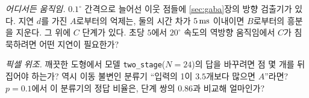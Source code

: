 \begin{exercise}[\lvlB]
\label{ex:12:7}
\emph{어디서든 움직임.} $0.1^\circ$ 간격으로 늘어선 이웃 점들에 \ref{sec:gaba}장의 방향 검출기가 있다. 지연 $d$를 가진 $A$로부터의 억제는, 둘의 시간 차가 $5\,\text{ms}$ 이내이면 $B$로부터의 흥분을 지운다. 그 위에 $C$ 단계가 있다. 초당 $5$에서 $20^\circ$ 속도의 역방향 움직임에서 $C$가 침묵하려면 어떤 지연이 필요한가?
\end{exercise}

\begin{exercise}[\lvlC]
\label{ex:12:8}
\emph{픽셀 위조.} 깨끗한 도형에서 모델 \texttt{two\_stage}($N=24$)의 답을 바꾸려면 점 몇 개를 뒤집어야 하는가? 역시 이동 불변인 분류기 “입력의 1이 $3.5$개보다 많으면 $A$”라면? $p=0.1$에서 이 분류기의 정답 비율은, 단계 쌍의 $0.86$과 비교해 얼마인가?
\end{exercise}
